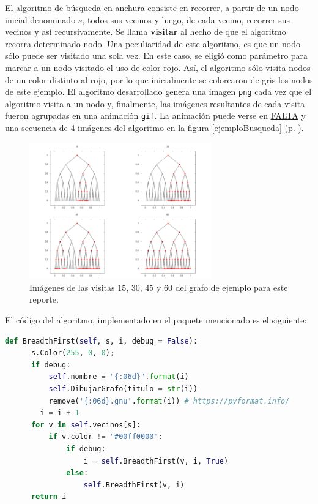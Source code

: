 \documentclass{article}
\begin{document}
  El algoritmo de búsqueda en anchura consiste en recorrer, a partir de un nodo inicial denominado $s$, todos sus vecinos y luego, de cada vecino, recorrer sus vecinos y así recursivamente. Se llama \textbf{visitar} al hecho de que el algoritmo recorra determinado nodo. Una peculiaridad de este algoritmo, es que un nodo sólo puede ser visitado una sola vez. En este caso, se eligió como parámetro para marcar a un nodo visitado el uso de color rojo. Así, el algoritmo sólo visita nodos de un color distinto al rojo, por lo que inicialmente se colorearon de gris los nodos de este ejemplo. El algoritmo desarrollado genera una imagen \texttt{png} cada vez que el algoritmo visita a un nodo y, finalmente, las imágenes resultantes de cada visita fueron agrupadas en una animación \texttt{gif}. La animación puede verse en \url{FALTA} y una secuencia de 4 imágenes del algoritmo en la figura \ref{ejemploBusqueda} (p. \pageref{ejemploBusqueda}).

  \begin{figure}[h]
    \includegraphics[width=0.7\textwidth]{ejemploBusqueda}
    \centering
    \caption{Imágenes de las visitas $15$, $30$, $45$ y $60$ del grafo de ejemplo para este reporte.}
    \label{arbolBinario}
  \end{figure}

  El código del algoritmo, implementado en el paquete mencionado es el siguiente:

  \begin{lstlisting}[language=Python]
    def BreadthFirst(self, s, i, debug = False):
      s.Color(255, 0, 0);
      if debug:
          self.nombre = "{:06d}".format(i)
          self.DibujarGrafo(titulo = str(i))
          remove('{:06d}.gnu'.format(i)) # https://pyformat.info/
        i = i + 1
      for v in self.vecinos[s]:
          if v.color != "#00ff0000":
              if debug:
                  i = self.BreadthFirst(v, i, True)
              else:
                  self.BreadthFirst(v, i)
      return i
  \end{lstlisting}
\end{document}
